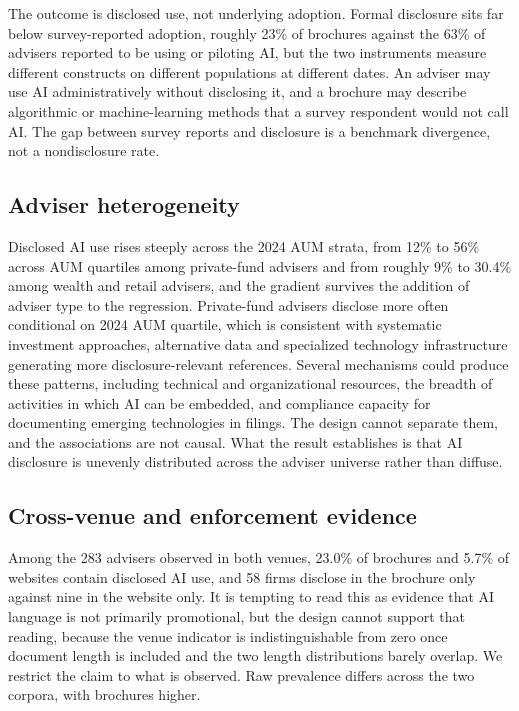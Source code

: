 \documentclass[utf8]{FrontiersinHarvard}
\begin{document}
The outcome is disclosed use, not underlying adoption. Formal disclosure sits far below survey-reported adoption, roughly 23\% of brochures against the 63\% of advisers reported to be using or piloting AI, but the two instruments measure different constructs on different populations at different dates. An adviser may use AI administratively without disclosing it, and a brochure may describe algorithmic or machine-learning methods that a survey respondent would not call AI. The gap between survey reports and disclosure is a benchmark divergence, not a nondisclosure rate.

\subsection{Adviser heterogeneity}

Disclosed AI use rises steeply across the 2024 AUM strata, from 12\% to 56\% across AUM quartiles among private-fund advisers and from roughly 9\% to 30.4\% among wealth and retail advisers, and the gradient survives the addition of adviser type to the regression. Private-fund advisers disclose more often conditional on 2024 AUM quartile, which is consistent with systematic investment approaches, alternative data and specialized technology infrastructure generating more disclosure-relevant references. Several mechanisms could produce these patterns, including technical and organizational resources, the breadth of activities in which AI can be embedded, and compliance capacity for documenting emerging technologies in filings. The design cannot separate them, and the associations are not causal. What the result establishes is that AI disclosure is unevenly distributed across the adviser universe rather than diffuse.

\subsection{Cross-venue and enforcement evidence}

Among the 283 advisers observed in both venues, 23.0\% of brochures and 5.7\% of websites contain disclosed AI use, and 58 firms disclose in the brochure only against nine in the website only. It is tempting to read this as evidence that AI language is not primarily promotional, but the design cannot support that reading, because the venue indicator is indistinguishable from zero once document length is included and the two length distributions barely overlap. We restrict the claim to what is observed. Raw prevalence differs across the two corpora, with brochures higher.
\end{document}
